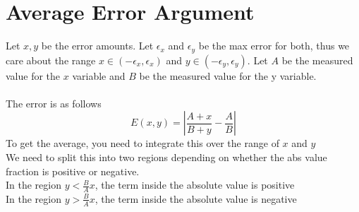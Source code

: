 \section{Average Error Argument}

Let $x,y$ be the error amounts. Let $\epsilon_x$ and $\epsilon_y$ be the max error for both, thus we care about the range $x \in (-\epsilon_x,\epsilon_x)$ and $y \in (-\epsilon_y,\epsilon_y)$. Let $A$ be the measured value for the $x$ variable and $B$ be the measured value for the y variable.\\
\\
The error is as follows
\[
E(x,y) = |\frac{A + x}{B + y} - \frac{A}{B} |
\]
To get the average, you need to integrate this over the range of $x$ and $y$\\
We need to split this into two regions depending on whether the abs value fraction is positive or negative. \\
In the region $y < \frac{B}{A} x$, the term inside the absolute value is positive\\
In the region $y > \frac{B}{A} x$, the term inside the absolute value is negative\\